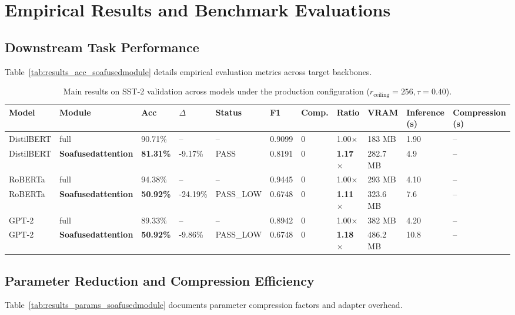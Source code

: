 \section{Empirical Results and Benchmark Evaluations}

\subsection{Downstream Task Performance}
Table~\ref{tab:results_acc_soafusedmodule} details empirical evaluation metrics across target backbones.

\begin{table}[t]
\centering
\small
\begin{tabular}{lllllllllll}
\toprule
\textbf{Model} & \textbf{Module} & \textbf{Acc} & \textbf{$\Delta$} & \textbf{Status} & \textbf{F1} & \textbf{Comp.} & \textbf{Ratio} & \textbf{VRAM} & \textbf{Inference (s)} & \textbf{Compression (s)} \\
\midrule
DistilBERT & full & 90.71\% & -- & -- & 0.9099 & 0 & 1.00$\times$ & 183 MB & 1.90 & -- \\
DistilBERT & \textbf{Soafusedattention} & \textbf{81.31\%} & -9.17\% & PASS & 0.8191 & 0 & \textbf{1.17$\times$} & 282.7 MB & 4.9 & -- \\
RoBERTa & full & 94.38\% & -- & -- & 0.9445 & 0 & 1.00$\times$ & 293 MB & 4.10 & -- \\
RoBERTa & \textbf{Soafusedattention} & \textbf{50.92\%} & -24.19\% & PASS\_LOW & 0.6748 & 0 & \textbf{1.11$\times$} & 323.6 MB & 7.6 & -- \\
GPT-2 & full & 89.33\% & -- & -- & 0.8942 & 0 & 1.00$\times$ & 382 MB & 4.20 & -- \\
GPT-2 & \textbf{Soafusedattention} & \textbf{50.92\%} & -9.86\% & PASS\_LOW & 0.6748 & 0 & \textbf{1.18$\times$} & 486.2 MB & 10.8 & -- \\
\bottomrule
\end{tabular}
\caption{Main results on SST-2 validation across models under the production configuration ($r_{\mathrm{ceiling}}=256, \tau=0.40$).}
\label{tab:main_sst2}
\end{table}

\subsection{Parameter Reduction and Compression Efficiency}
Table~\ref{tab:results_params_soafusedmodule} documents parameter compression factors and adapter overhead.

